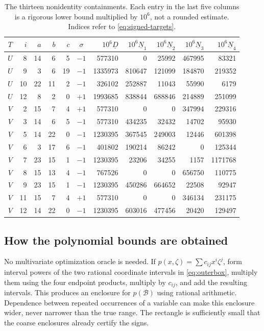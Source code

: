 \documentclass[11pt,a4paper]{article}
\theoremstyle{definition}\newtheorem{definition}[theorem]{Definition}
\theoremstyle{remark}\newtheorem{remark}[theorem]{Remark}
\newcommand{\cB}{\mathcal B}
\begin{document}
\begin{table}[htbp]
\centering
\caption{The thirteen nonidentity containments. Each entry in the last five
columns is a rigorous lower bound multiplied by $10^6$, not a rounded
estimate. Indices refer to \eqref{eq:signed-targets}.}
\label{tab:containment}
\scriptsize\setlength{\tabcolsep}{3.2pt}
\begin{tabular}{crrrrc|rrrrr}
\toprule
$T$&$i$&$a$&$b$&$c$&$\sigma$&$10^6\underline D$&$10^6\underline N_1$&$10^6\underline N_2$&$10^6\underline N_3$&$10^6\underline N_4$\\
\midrule
$U$ & 8 & 14 & 6 & 5 & $-1$ & 577310 & 0 & 25992 & 467995 & 83321 \\
$U$ & 9 & 3 & 6 & 19 & $-1$ & 1335973 & 810647 & 121099 & 184870 & 219352 \\
$U$ & 10 & 22 & 11 & 2 & $-1$ & 326102 & 252887 & 11043 & 55990 & 6179 \\
$U$ & 12 & 8 & 2 & 0 & $+1$ & 1993685 & 838844 & 688846 & 214889 & 251099 \\
$V$ & 2 & 15 & 7 & 4 & $+1$ & 577310 & 0 & 0 & 347994 & 229316 \\
$V$ & 3 & 14 & 6 & 5 & $-1$ & 577310 & 434235 & 32432 & 14702 & 95930 \\
$V$ & 5 & 14 & 22 & 0 & $-1$ & 1230395 & 367545 & 249003 & 12446 & 601398 \\
$V$ & 6 & 3 & 17 & 6 & $-1$ & 401802 & 190214 & 86242 & 0 & 125344 \\
$V$ & 7 & 23 & 15 & 1 & $-1$ & 1230395 & 23206 & 34255 & 1157 & 1171768 \\
$V$ & 8 & 15 & 13 & 4 & $-1$ & 767526 & 0 & 0 & 656750 & 110775 \\
$V$ & 9 & 23 & 15 & 1 & $-1$ & 1230395 & 450286 & 664652 & 22508 & 92947 \\
$V$ & 11 & 15 & 7 & 4 & $+1$ & 577310 & 0 & 0 & 346134 & 231175 \\
$V$ & 12 & 14 & 22 & 0 & $-1$ & 1230395 & 603016 & 477456 & 20420 & 129497 \\
\bottomrule
\end{tabular}
\end{table}

\subsection{How the polynomial bounds are obtained}
No multivariate optimization oracle is needed. If
$p(x,\zeta)=\sum c_{ij}x^i\zeta^j$, form interval powers of the two rational
coordinate intervals in \eqref{eq:outerbox}, multiply them using the four
endpoint products, multiply by $c_{ij}$, and add the resulting intervals.
This produces an enclosure for $p(\cB)$ using rational arithmetic.
Dependence between repeated occurrences of a variable can make this enclosure
wider, never narrower than the true range. The rectangle is sufficiently
small that the coarse enclosures already certify the signs.
\end{document}
